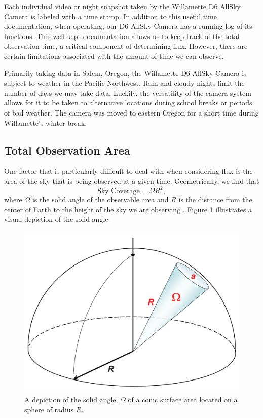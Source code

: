 Each individual video or night snapshot taken by the Willamette D6 AllSky Camera is labeled with a time stamp.  
In addition to this useful time documentation, when operating, our D6 AllSky Camera has a running log of its functions.
This well-kept documentation allows us to keep track of the total observation time, a critical component of determining flux.  
However, there are certain limitations associated with the amount of time we can observe.

Primarily taking data in Salem, Oregon, the Willamette D6 AllSky Camera is subject to weather in the Pacific Northwest.  
Rain and cloudy nights limit the number of days we may take data.
Luckily, the versatility of the camera system allows for it to be taken to alternative locations during school breaks or periods of bad weather.
The camera was moved to eastern Oregon for a short time during Willamette's winter break.


\subsection{Total Observation Area}

One factor that is particularly difficult to deal with when considering flux is the area of the sky that is being observed at a given time.
Geometrically, we find that
\begin{equation}
    \text{Sky Coverage} = \Omega R^2,
    \label{area_eq}
\end{equation}
where $\Omega$ is the solid angle of the observable area and $R$ is the distance from the center of Earth to the height of the sky we are observing \cite{russell_photometry_2018}.
Figure \ref{solid_ang} illustrates a visual depiction of the solid angle.  

\begin{figure}[ht!]
  \centering
  \includegraphics[scale=0.07]{images/solidangle.png}
  \caption{A depiction of the solid angle, $\Omega$ of a conic surface area located on a sphere of radius $R$.}
  \label{solid_ang}
\end{figure}

